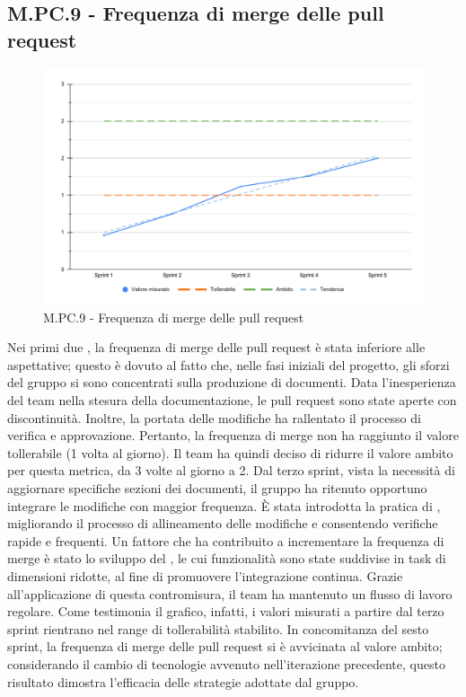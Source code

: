 \subsection{M.PC.9 - Frequenza di merge delle pull request}
\begin{figure}[H]
    \centering
    \includegraphics[width=\textwidth]{assets/frequenza_pull_request.pdf}
    \caption{M.PC.9 - Frequenza di merge delle pull request}
\end{figure}

\par Nei primi due , la frequenza di merge delle pull request è stata inferiore alle aspettative; questo è dovuto al fatto che, nelle fasi iniziali del progetto, gli sforzi del gruppo si sono concentrati sulla produzione di documenti. Data l’inesperienza del team nella stesura della documentazione, le pull request sono state aperte con discontinuità. Inoltre, la portata delle modifiche ha rallentato il processo di verifica e approvazione. Pertanto, la frequenza di merge non ha raggiunto il valore tollerabile (1 volta al giorno). Il team ha quindi deciso di ridurre il valore ambito per questa metrica, da 3 volte al giorno a 2. Dal terzo sprint, vista la necessità di aggiornare specifiche sezioni dei documenti, il gruppo ha ritenuto opportuno integrare le modifiche con maggior frequenza. È stata introdotta la pratica di , migliorando il processo di allineamento delle modifiche e consentendo verifiche rapide e frequenti. Un fattore che ha contribuito a incrementare la frequenza di merge è stato lo sviluppo del , le cui funzionalità sono state suddivise in task di dimensioni ridotte, al fine di promuovere l'integrazione continua. Grazie all’applicazione di questa contromisura, il team ha mantenuto un flusso di lavoro regolare. Come testimonia il grafico, infatti, i valori misurati a partire dal terzo sprint rientrano nel range di tollerabilità stabilito. In concomitanza del sesto sprint, la frequenza di merge delle pull request si è avvicinata al valore ambito; considerando il cambio di tecnologie avvenuto nell’iterazione precedente, questo risultato dimostra l’efficacia delle strategie adottate dal gruppo.
